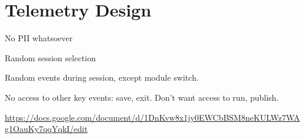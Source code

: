 \documentclass[
  acmsmall,
  review,
]{acmart}
\begin{document}
\begin{table}
\begin{tabular}{ll}
  \end{tabular}
\end{table}

\section{Telemetry Design}

No PII whatsoever

Random session selection

Random events during session, except module switch.

No access to other key events: save, exit.
Don't want access to run, publish.

\url{https://docs.google.com/document/d/1DnKvw8x1jy0EWCbBSM8neKULWz7WAg1OauKy7qqYqkI/edit}
\end{document}
